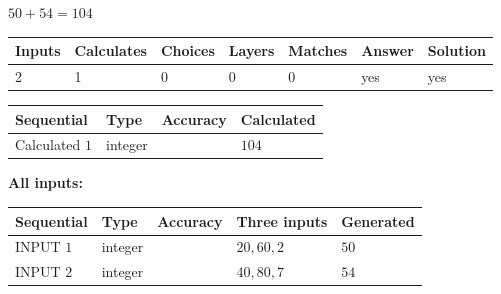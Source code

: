 \documentclass[12pt]{article}
\begin{document}
 
\noindent{}
 
 

 
 
 
\noindent{}
 
 

$ %
50 +  %
54=   %
104$
 
 
\noindent{}
 
 

 
   
   
   
   
\noindent\begin{tabular}{|l|l|l|l|l|l|l|}
 \hline
Inputs & Calculates & Choices & Layers & Matches & Answer & Solution \\ \hline
 2  & 
 1  & 
 0
  & 
 0  & 
 0  & 
  yes & 
  yes 
  \\ \hline
 \end{tabular}
   
   
   
   
\noindent{}
   
   
  
  
\noindent\begin{tabular}{|l|l|l|l|}
\hline
 Sequential & Type & Accuracy & Calculated \\ 
\hline
 
 
  Calculated $  1 $ & integer &  & 
  $ 104 $ 
 \\  \hline  
 \end{tabular}
   
   
   
   
\noindent\vspace{0.1in}\hspace{-0.08in} {\textbf{\Large{All inputs: }}}
   
   
  
  
\noindent\begin{tabular}{|l|l|l|l|l|}
\hline
 Sequential & Type & Accuracy & Three inputs & Generated \\ 
\hline
 
 
  INPUT $  1 $ & integer &  & $
 20
 , 
 60
 , 
 2
 $ & $ 50 $ 
 \\  \hline  
 
 
  INPUT $  2 $ & integer &  & $
 40
 , 
 80
 , 
 7
 $ & $ 54 $ 
 \\  \hline  
 \end{tabular}
   
\end{document}
